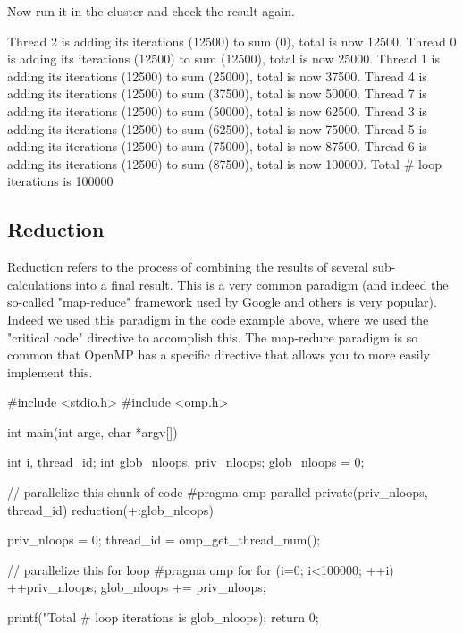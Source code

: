 Now run it in the cluster and check the result again.

\begin{prompt}
Thread 2 is adding its iterations (12500) to sum (0), total is now 12500.
Thread 0 is adding its iterations (12500) to sum (12500), total is now 25000.
Thread 1 is adding its iterations (12500) to sum (25000), total is now 37500.
Thread 4 is adding its iterations (12500) to sum (37500), total is now 50000.
Thread 7 is adding its iterations (12500) to sum (50000), total is now 62500.
Thread 3 is adding its iterations (12500) to sum (62500), total is now 75000.
Thread 5 is adding its iterations (12500) to sum (75000), total is now 87500.
Thread 6 is adding its iterations (12500) to sum (87500), total is now 100000.
Total # loop iterations is 100000
\end{prompt}

\subsection{Reduction}

Reduction refers to the process of combining the results of several
sub-calculations into a final result. This is a very common paradigm (and
indeed the so-called "map-reduce" framework used by Google and others is very
popular). Indeed we used this paradigm in the code example above, where we used
the "critical code" directive to accomplish this. The map-reduce paradigm is so
common that OpenMP has a specific directive that allows you to more easily
implement this.

\begin{prompt}
#include <stdio.h>
#include <omp.h>

int main(int argc, char *argv[])
{
    int i, thread_id;
    int glob_nloops, priv_nloops;
    glob_nloops = 0;

    // parallelize this chunk of code
    #pragma omp parallel private(priv_nloops, thread_id) reduction(+:glob_nloops)
    {
        priv_nloops = 0;
        thread_id = omp_get_thread_num();

        // parallelize this for loop
        #pragma omp for
        for (i=0; i<100000; ++i)
        {
            ++priv_nloops;
        }
        glob_nloops += priv_nloops;
    }
    printf("Total # loop iterations is %
           glob_nloops);
    return 0;
}
\end{prompt}

